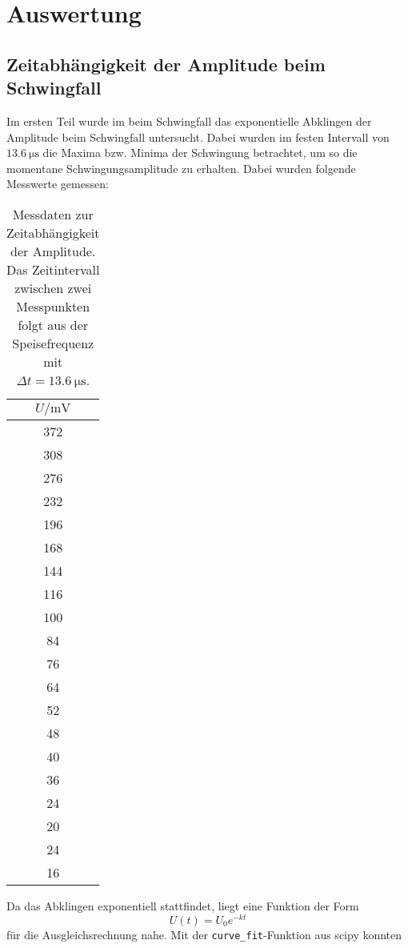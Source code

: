 \section{Auswertung}
\label{sec:Auswertung}

\subsection{Zeitabhängigkeit der Amplitude beim Schwingfall}
\label{sec:Zeitabhängigkeit der Amplitude beim Schwingfall}
Im ersten Teil wurde im beim Schwingfall das exponentielle Abklingen der Amplitude beim
Schwingfall untersucht. Dabei wurden im festen Intervall von $\SI{13.6}{\micro\second}$
die Maxima bzw. Minima der Schwingung betrachtet, um so die momentane Schwingungsamplitude
zu erhalten. Dabei wurden folgende Messwerte gemessen:
\begin{table}
	\centering
	\caption{Messdaten zur Zeitabhängigkeit der Amplitude. Das Zeitintervall zwischen
		zwei Messpunkten folgt aus der Speisefrequenz mit $\Delta t =
	\SI{13.6}{\micro\second}$.}
	\label{tab:Messwerte-5a}
	\begin{tabular}{c}
		\toprule
		$U / \si{\milli\volt}$\\
		\midrule
		372	\\
		308	\\
		276	\\
		232	\\
		196	\\
		168	\\
		144	\\
		116	\\
		100	\\
		84 	\\
		76 	\\
		64 	\\
		52 	\\
		48 	\\
		40 	\\
		36 	\\
		24 	\\
		20 	\\
		24 	\\
		16 	\\
		\bottomrule
	\end{tabular}
\end{table}
Da das Abklingen exponentiell stattfindet, liegt eine Funktion der Form
\begin{equation}
	U(t) = U_0 e^{-kt}
\end{equation}
für die Ausgleichsrechnung nahe. Mit der \texttt{curve\_fit}-Funktion aus scipy konnten

